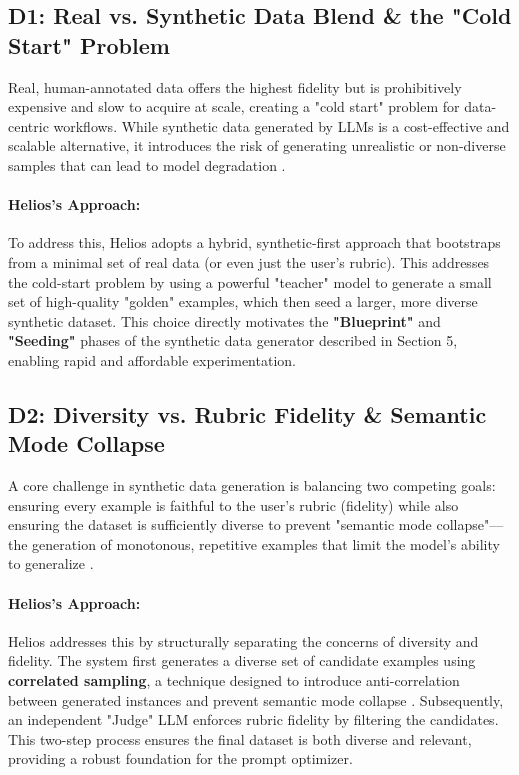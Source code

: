 \documentclass{article}
\begin{document}
\subsection*{D1: Real vs. Synthetic Data Blend \& the "Cold Start" Problem}
Real, human-annotated data offers the highest fidelity but is prohibitively expensive and slow to acquire at scale, creating a "cold start" problem for data-centric workflows. While synthetic data generated by LLMs is a cost-effective and scalable alternative, it introduces the risk of generating unrealistic or non-diverse samples that can lead to model degradation \citep{patel2024datadreamertoolsyntheticdata}.

\paragraph{Helios's Approach:} To address this, Helios adopts a hybrid, synthetic-first approach that bootstraps from a minimal set of real data (or even just the user's rubric). This addresses the cold-start problem by using a powerful "teacher" model to generate a small set of high-quality "golden" examples, which then seed a larger, more diverse synthetic dataset. This choice directly motivates the \textbf{"Blueprint"} and \textbf{"Seeding"} phases of the synthetic data generator described in Section 5, enabling rapid and affordable experimentation.

\subsection*{D2: Diversity vs. Rubric Fidelity \& Semantic Mode Collapse}
A core challenge in synthetic data generation is balancing two competing goals: ensuring every example is faithful to the user's rubric (fidelity) while also ensuring the dataset is sufficiently diverse to prevent "semantic mode collapse"—the generation of monotonous, repetitive examples that limit the model's ability to generalize \citep{yu2023largelanguagemodelattributed}.

\paragraph{Helios's Approach:} Helios addresses this by structurally separating the concerns of diversity and fidelity. The system first generates a diverse set of candidate examples using \textbf{correlated sampling}, a technique designed to introduce anti-correlation between generated instances and prevent semantic mode collapse \citep{kowshik2024corrsynthcorrelatedsampling}. Subsequently, an independent "Judge" LLM enforces rubric fidelity by filtering the candidates. This two-step process ensures the final dataset is both diverse and relevant, providing a robust foundation for the prompt optimizer.
\end{document}
